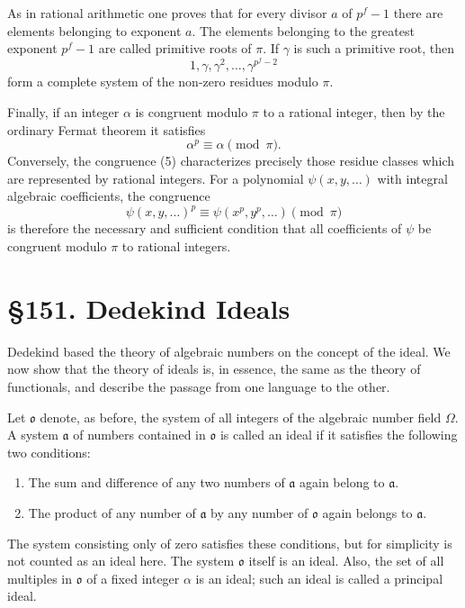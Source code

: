 \documentclass[11pt,a4paper]{book}
\newcommand{\webersection}[2]{\clearpage\section*{\S #1. #2}}
\begin{document}
As in rational arithmetic one proves that for every divisor \(a\) of \(p^f-1\) there are elements belonging to exponent \(a\).  The elements belonging to the greatest exponent \(p^f-1\) are called primitive roots of \(\pi\).  If \(\gamma\) is such a primitive root, then
\[
 1,\gamma,
\gamma^2,
\ldots,
\gamma^{p^f-2}
\]
form a complete system of the non-zero residues modulo \(\pi\).

Finally, if an integer \(\alpha\) is congruent modulo \(\pi\) to a rational integer, then by the ordinary Fermat theorem it satisfies
\begin{equation}
 \alpha^p\equiv \alpha\pmod{\pi}. \tag{5}
\end{equation}
Conversely, the congruence (5) characterizes precisely those residue classes which are represented by rational integers.  For a polynomial \(\psi(x,y,
\ldots)\) with integral algebraic coefficients, the congruence
\begin{equation}
 \psi(x,y,
\ldots)^p\equiv \psi(x^p,y^p,
\ldots)\pmod{\pi} \tag{6}
\end{equation}
is therefore the necessary and sufficient condition that all coefficients of \(\psi\) be congruent modulo \(\pi\) to rational integers.

\webersection{151}{Dedekind Ideals}

Dedekind based the theory of algebraic numbers on the concept of the ideal.  We now show that the theory of ideals is, in essence, the same as the theory of functionals, and describe the passage from one language to the other.

Let \(\mathfrak o\) denote, as before, the system of all integers of the algebraic number field \(\Omega\).  A system \(\mathfrak a\) of numbers contained in \(\mathfrak o\) is called an ideal if it satisfies the following two conditions:
\begin{enumerate}[label=\Roman*.]
\item The sum and difference of any two numbers of \(\mathfrak a\) again belong to \(\mathfrak a\).
\item The product of any number of \(\mathfrak a\) by any number of \(\mathfrak o\) again belongs to \(\mathfrak a\).
\end{enumerate}
The system consisting only of zero satisfies these conditions, but for simplicity is not counted as an ideal here.  The system \(\mathfrak o\) itself is an ideal.  Also, the set of all multiples in \(\mathfrak o\) of a fixed integer \(\alpha\) is an ideal; such an ideal is called a principal ideal.
\end{document}
